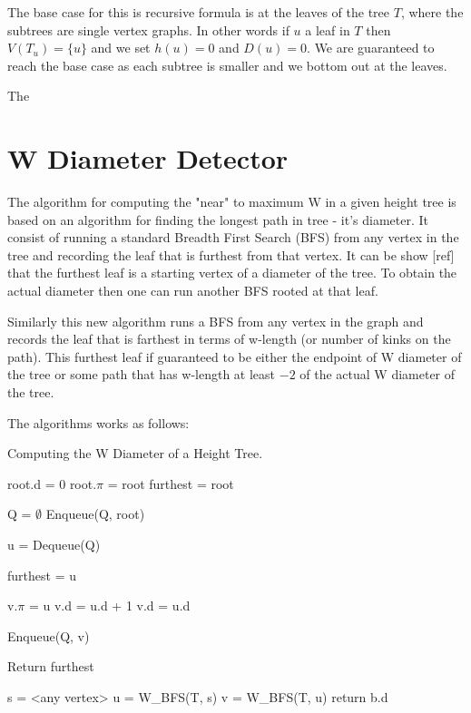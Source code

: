 The base case for this is recursive formula is at the leaves of the tree $T$, where the subtrees are single vertex graphs. In other words if $u$ a leaf in $T$ then $V(T_u) = \{u\}$ and we set $h(u) = 0$ and $D(u) = 0$. We are guaranteed to reach the base case as each subtree is smaller and we bottom out at the leaves.

The 


\section{W Diameter Detector}


The algorithm for computing the "near" to maximum W in a given height tree is based on an algorithm for finding the longest path in tree - it's diameter. It consist of running a standard Breadth First Search (BFS) from any vertex in the tree and recording the leaf that is furthest from that vertex. It can be show [ref] that the furthest leaf is a starting vertex of a diameter of the tree. To obtain the actual diameter then one can run another BFS rooted at that leaf.

Similarly this new algorithm runs a BFS from any vertex in the graph and records the leaf that is farthest in terms of w-length (or number of kinks on the path). This furthest leaf if guaranteed to be either the endpoint of W diameter of the tree or some path that has w-length at least $-2$ of the actual W diameter of the tree. 

The algorithms works as follows:


\begin{algorithm}
\caption{Computing the W Diameter of a Height Tree.}

\begin{algorithmic}[1]

    \State root.d = 0
    \State root.$\pi$ = root
    \State furthest = root

    \State Q = $\emptyset$
    \State Enqueue(Q, root)

        \State u = Dequeue(Q)

            \State furthest = u
        \EndIf

                \State v.$\pi$ = u
                    \State v.d = u.d + 1
                \Else
                    \State v.d = u.d
                \EndIf

                \State Enqueue(Q, v)

            \EndIf
        \EndFor
    \EndWhile
    \State Return furthest
\EndFunction

    \State s = <any vertex>
    \State u = W\_BFS(T, s)
    \State v = W\_BFS(T, u)
    \State return b.d
\EndFunction

\end{algorithmic}
\end{algorithm}

